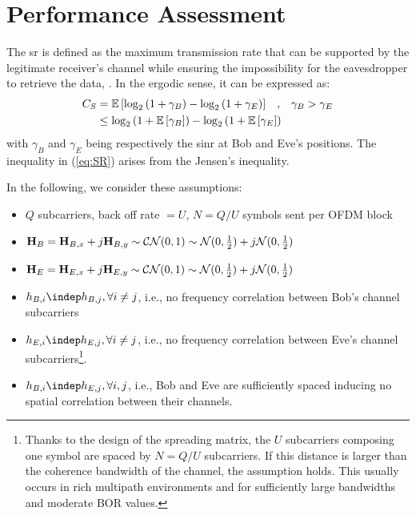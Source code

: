 \section{Performance Assessment} 
\label{sec:perf}
The \gls{sr} is defined as the maximum transmission rate that can be supported by the legitimate receiver's channel while ensuring the impossibility for the eavesdropper to retrieve the data, \cite{7348007}. In the ergodic sense, it can be expressed as:
\begin{equation}
\begin{split}
    C_S &=  \mathbb{E} \left[\log_2{\left(1+\gamma_B\right)} - \log_2{\left(1+\gamma_E\right)}\right] \; \; \; , \; \; \;  \gamma_B > \gamma_E \\
    &\leq   \log_2 \left( 1+ \mathbb{E} \left[\gamma_B\right] \right) - \log_2 \left( 1+ \mathbb{E} \left[\gamma_E\right]\right) 
    \end{split}
    \label{eq:SR}
\end{equation}
with $\gamma_B$ and $\gamma_E$ being respectively the \gls{sinr} at Bob and Eve's positions. The inequality in (\ref{eq:SR}) arises from the Jensen's inequality. 


In the following, we consider these assumptions:
\begin{itemize}
\item $Q$ subcarriers, back off rate $= U$, $N = Q/U$ symbols sent per OFDM block
\item  $\boldsymbol{\mathrm{H}}_B = \boldsymbol{\mathrm{H}}_{B,x} + j\boldsymbol{\mathrm{H}}_{B,y} \sim \mathcal{CN}(0,1) \sim \mathcal{N}(0,\frac{1}{2}) + j \mathcal{N}(0,\frac{1}{2}) $
\item  $\boldsymbol{\mathrm{H}}_E = \boldsymbol{\mathrm{H}}_{E,x} + j\boldsymbol{\mathrm{H}}_{E,y} \sim \mathcal{CN}(0,1) \sim \mathcal{N}(0,\frac{1}{2}) + j \mathcal{N}(0,\frac{1}{2}) $
\item $h_{B,i} \indep h_{B,j}, \forall i \neq j$, i.e., no frequency correlation between Bob's channel subcarriers
\item $h_{E,i} \indep h_{E,j}, \forall i \neq j$, i.e., no frequency correlation between Eve's channel subcarriers\footnote{Thanks to the design of the spreading matrix, the $U$ subcarriers composing one symbol are spaced by $N = Q/U$ subcarriers. If this distance is larger than the coherence bandwidth of the channel, the assumption holds. This usually occurs in rich multipath environments and for sufficiently large bandwidths and moderate BOR values.}.
\item $h_{B,i} \indep h_{E,j}, \forall i,j$, i.e., Bob and Eve are sufficiently spaced inducing no spatial correlation between their channels.
\end{itemize}



